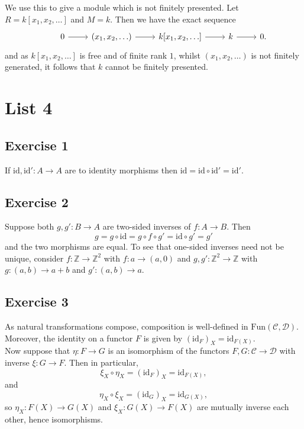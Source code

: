 \documentclass{article}
\theoremstyle{definition}
\newcommand{\Z}{\mathbb{Z}}
\newcommand{\id}{\text{id}}
\begin{document}
We use this to give a module which is not finitely presented. Let $R = k[x_1, x_2, \ldots]$
and $M = k$. Then we have the exact sequence 
\[
\begin{tikzcd}
	& 0
	\arrow{r}
	& (x_1, x_2, \ldots)
	\arrow{r}
	& k[x_1, x_2, \ldots]
	\arrow{r}
	& k
	\arrow{r}
	& 0.
\end{tikzcd}
\] 
and as $k[x_1, x_2, \ldots]$ is free and of finite rank $1$, whilst $(x_1, x_2,
\ldots)$ is not finitely generated, it follows that $k$ cannot be finitely
presented.

\section*{List 4}

\subsection*{Exercise 1}

If $\id, \id' : A \to A$ are to identity morphisms then $\id = \id \circ \id' =
\id'$.

\subsection*{Exercise 2}
Suppose both $g, g' : B \to A$ are two-sided inverses of $f : A \to B$.
Then
\[
	g 
	= 
	g \circ \id 
	= 
	g \circ f \circ g'
	= 
	\id \circ g'
	= 
	g'
\]
and the two morphisms are equal. To see that one-sided inverses need not be
unique, consider $f : \Z \to \Z^{2}$ with $f : a \to (a, 0)$ and $g, g' : \Z^{2}
\to \Z$ with $g : (a, b) \to a + b$ and $g' : (a, b) \to a$.

\subsection*{Exercise 3}

As natural transformations compose, composition is well-defined in
$\text{Fun}(\mathcal{C}, \mathcal{D})$. Moreover, the identity on a functor $F$
is given by $(\id_F)_X = \id_{F(X)}$. \\

Now suppose that $\eta : F \to G$ is an isomorphism of the functors $F, G :
\mathcal{C} \to \mathcal{D}$ with inverse $\xi : G \to F$. Then in particular,
\[
	\xi_X \circ \eta_{X} = (\id_{F})_X = \id_{F(X)},
\]
and 
\[
	\eta_X \circ \xi_X 
	=
	(\id_{G})_X
	=
	\id_{G(X)},
\]
so $\eta_X : F(X) \to G(X)$ and $\xi_X : G(X) \to F(X)$ are mutually inverse
each other, hence isomorphisms. \\
\end{document}
